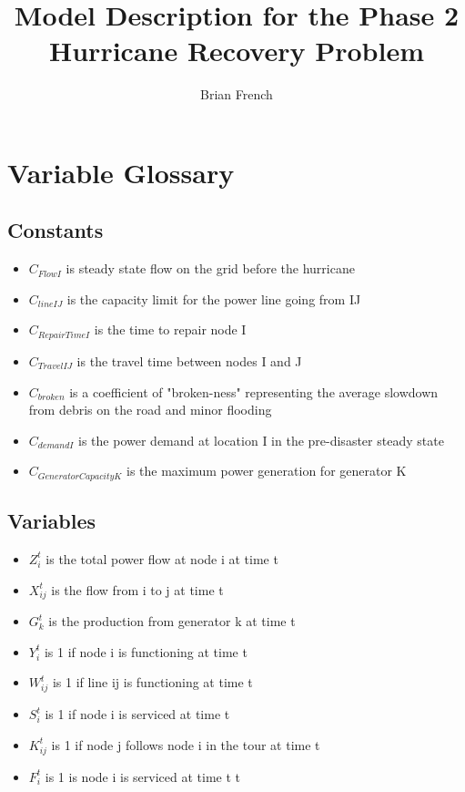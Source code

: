 \documentclass{article}
\begin{document}
	\title{Model Description for the Phase 2 Hurricane Recovery Problem}
	\author{Brian French}
	\maketitle
	
	\section{Variable Glossary}
	\subsection{Constants}
	\begin{itemize}
		\item $C_{FlowI}$ is steady state flow on the grid before the hurricane
		\item $C_{lineIJ}$ is the capacity limit for the power line going from IJ
		\item $C_{RepairTimeI}$ is the time to repair node I
		\item $C_{TravelIJ}$ is the travel time between nodes I and J
		\item $C_{broken}$ is a coefficient of "broken-ness" representing the average slowdown from debris on the road and minor flooding
		\item $C_{demandI}$ is the power demand at location I in the pre-disaster steady state
		\item $C_{GeneratorCapacityK}$ is the maximum power generation for generator K
	\end{itemize}
	\subsection{Variables}
	\begin{itemize}
		\item $Z_{i}^{t}$ is the total power flow at node i at time t
		\item $X_{ij}^{t}$ is the flow from i to j at time t
		\item $G_{k}^t$ is the production from generator k at time t
		\item $Y_i^t$ is 1 if node i is functioning at time t
		\item $W_{ij}^t$ is 1 if line ij is functioning at time t
		\item $S_{i}^t$ is 1 if node i is serviced at time t
		\item $K_{ij}^t$ is 1 if node j follows node i in the tour at time t 
		\item $F_i^t$ is 1 is node i is serviced at time t t
	\end{itemize}
\end{document}
